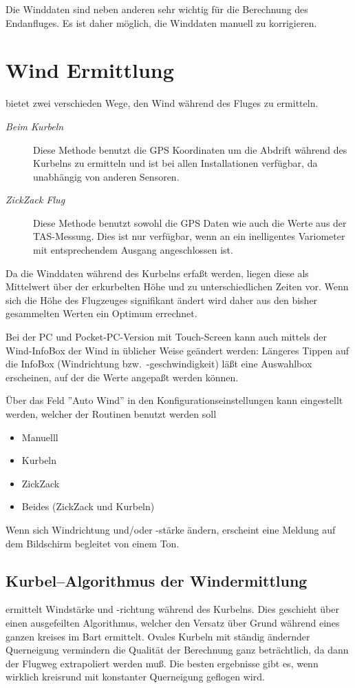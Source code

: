 Die Winddaten sind neben anderen sehr wichtig für die Berechnung des Endanfluges.
Es ist daher möglich, die Winddaten manuell zu korrigieren.

\section{Wind Ermittlung}\label{sec:wind-estimation}
\xc bietet zwei verschieden Wege, den Wind während des Fluges zu ermitteln.
\begin{description}
\item[\textit{Beim Kurbeln}]  Diese Methode benutzt die  GPS Koordinaten um die Abdrift während
des Kurbelns zu ermitteln und ist bei allen \xc Installationen verfügbar, da unabhängig von anderen Sensoren.
\item[\textit{ZickZack Flug}] Diese Methode benutzt sowohl die GPS Daten wie auch die Werte aus der TAS-Messung.
Dies ist nur verfügbar, wenn \xc an ein inelligentes Variometer mit entsprechendem Ausgang angeschlossen ist.
\end{description}

Da die Winddaten während des Kurbelns erfaßt werden, liegen diese als Mittelwert über der erkurbelten Höhe und
zu unterschiedlichen Zeiten vor. Wenn sich die Höhe des Flugzeuges signifikant ändert wird daher aus den
bisher gesammelten Werten ein Optimum errechnet.

Bei der PC und Pocket-PC-Version mit Touch-Screen kann auch mittels der Wind-InfoBox der Wind in
üblicher Weise geändert werden:
Längeres Tippen auf die InfoBox (Windrichtung bzw.\ -geschwindigkeit) läßt eine Auswahlbox
erscheinen, auf der die Werte angepaßt  werden können.

Über das Feld ''Auto Wind'' in den Konfigurationseinstellungen  kann
eingestellt werden, welcher der Routinen benutzt werden soll

\begin{itemize}
\item Manuelll
\item Kurbeln
\item ZickZack
\item Beides (ZickZack und Kurbeln)
\end{itemize}

Wenn sich Windrichtung und/oder -stärke ändern, erscheint eine Meldung  auf dem Bildschirm begleitet von einem Ton.
\subsection*{Kurbel--Algorithmus der Windermittlung}
\xc ermittelt Windstärke und -richtung während des Kurbelns. Dies geschieht über einen ausgefeilten Algorithmus, welcher den Versatz über Grund während eines ganzen kreises im Bart ermittelt. Ovales Kurbeln mit ständig ändernder Querneigung vermindern die Qualität der Berechnung ganz beträchtlich, da dann der Flugweg extrapoliert werden muß. Die besten ergebnisse gibt es, wenn wirklich kreisrund mit konstanter Querneigung geflogen wird.

